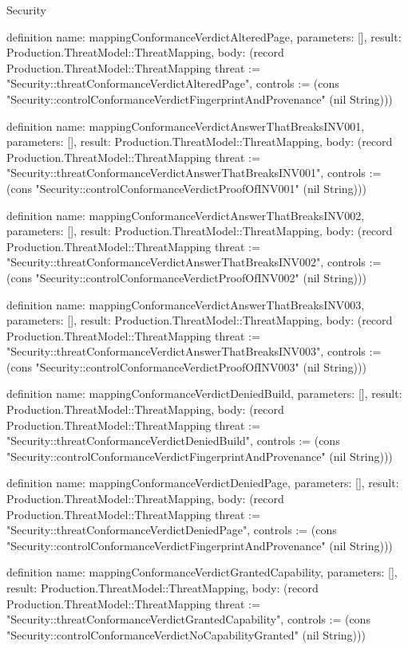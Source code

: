 \begin{lexlean}{Security}
\begin{semanticmodule}
definition{
  name: mappingConformanceVerdictAlteredPage,
  parameters: [],
  result: Production.ThreatModel::ThreatMapping,
  body: (record Production.ThreatModel::ThreatMapping {threat := "Security::threatConformanceVerdictAlteredPage", controls := (cons "Security::controlConformanceVerdictFingerprintAndProvenance" (nil String))})
}

definition{
  name: mappingConformanceVerdictAnswerThatBreaksINV001,
  parameters: [],
  result: Production.ThreatModel::ThreatMapping,
  body: (record Production.ThreatModel::ThreatMapping {threat := "Security::threatConformanceVerdictAnswerThatBreaksINV001", controls := (cons "Security::controlConformanceVerdictProofOfINV001" (nil String))})
}

definition{
  name: mappingConformanceVerdictAnswerThatBreaksINV002,
  parameters: [],
  result: Production.ThreatModel::ThreatMapping,
  body: (record Production.ThreatModel::ThreatMapping {threat := "Security::threatConformanceVerdictAnswerThatBreaksINV002", controls := (cons "Security::controlConformanceVerdictProofOfINV002" (nil String))})
}

definition{
  name: mappingConformanceVerdictAnswerThatBreaksINV003,
  parameters: [],
  result: Production.ThreatModel::ThreatMapping,
  body: (record Production.ThreatModel::ThreatMapping {threat := "Security::threatConformanceVerdictAnswerThatBreaksINV003", controls := (cons "Security::controlConformanceVerdictProofOfINV003" (nil String))})
}

definition{
  name: mappingConformanceVerdictDeniedBuild,
  parameters: [],
  result: Production.ThreatModel::ThreatMapping,
  body: (record Production.ThreatModel::ThreatMapping {threat := "Security::threatConformanceVerdictDeniedBuild", controls := (cons "Security::controlConformanceVerdictFingerprintAndProvenance" (nil String))})
}

definition{
  name: mappingConformanceVerdictDeniedPage,
  parameters: [],
  result: Production.ThreatModel::ThreatMapping,
  body: (record Production.ThreatModel::ThreatMapping {threat := "Security::threatConformanceVerdictDeniedPage", controls := (cons "Security::controlConformanceVerdictFingerprintAndProvenance" (nil String))})
}

definition{
  name: mappingConformanceVerdictGrantedCapability,
  parameters: [],
  result: Production.ThreatModel::ThreatMapping,
  body: (record Production.ThreatModel::ThreatMapping {threat := "Security::threatConformanceVerdictGrantedCapability", controls := (cons "Security::controlConformanceVerdictNoCapabilityGranted" (nil String))})
}


\end{semanticmodule}
\end{lexlean}
